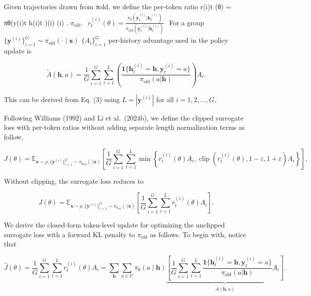 \documentclass[
  10
]{article}
\begin{document}
Given trajectories drawn from πold, we define the per-token ratio r(i)t
(θ) = πθ(y(i)t \textbar h(i)t )(i) (i) .
\(\pi _ { \mathrm { o l d } } .\)
\(\begin{array} { r } { r _ { t } ^ { ( i ) } ( \theta ) = \frac { \pi _ { \theta } ( \mathbf { y } _ { t } ^ { ( i ) } | \mathbf { h } _ { t } ^ { ( i ) } ) } { \pi _ { \mathrm { o l d } } ( \mathbf { y } _ { t } ^ { ( i ) } | \mathbf { h } _ { t } ^ { ( i ) } ) } } \end{array}\)
For a group
\(\{ \mathbf { y } ^ { ( i ) } \} _ { i = 1 } ^ { G } \sim \pi _ { \mathrm { o l d } } ( \cdot \mid \mathbf { x } )\)
\(\{ A _ { i } \} _ { i = 1 } ^ { G }\) per-history advantage used in
the policy update is

\[
\tilde {A} (\mathbf {h}, a) = \frac {1}{G} \sum_ {i = 1} ^ {G} \sum_ {t = 1} ^ {L} \left(\frac {\mathbf {1} \{\mathbf {h} _ {t} ^ {(i)} = \mathbf {h} , \mathbf {y} _ {t} ^ {(i)} = a \}}{\pi_ {\mathrm{old}} (a | \mathbf {h})}\right) A _ {i}.
\]

This can be derived from Eq. (3) using
\(L = | \mathbf { y } ^ { ( i ) } |\) for all
\(i = 1 , 2 , \dots , G .\)

Following Williams (1992) and Li et al.~(2024b), we define the clipped
surrogate loss with per-token ratios without adding separate length
normalization terms as follow,

\[
J (\theta) = \mathbb {E} _ {\mathbf {x} \sim \rho , \{\mathbf {y} ^ {(i)} \} _ {i = 1} ^ {G} \sim \pi_ {\theta_ {\mathrm{old}}} (\cdot | \mathbf {x})} \left[ \frac {1}{G} \sum_ {i = 1} ^ {G} \sum_ {t = 1} ^ {L} \min \left\{r _ {t} ^ {(i)} (\theta) A _ {i}, \operatorname{clip} (r _ {t} ^ {(i)} (\theta), 1 - \varepsilon , 1 + \varepsilon) A _ {i} \right\} \right],
\]

Without clipping, the surrogate loss reduces to

\[
J (\theta) = \mathbb {E} _ {\mathbf {x} \sim \rho , \{\mathbf {y} ^ {(i)} \} _ {i = 1} ^ {G} \sim \pi_ {\theta_ {\mathrm{old}}} (\cdot | \mathbf {x})} \left[ \frac {1}{G} \sum_ {i = 1} ^ {G} \sum_ {t = 1} ^ {L} r _ {t} ^ {(i)} (\theta) A _ {i} \right].
\]

We derive the closed-form token-level update for optimizing the
unclipped surrogate loss with a forward KL penalty to
\(\pi _ { \mathrm { o l d } }\) as follows. To begin with, notice that

\[
\hat {J} (\theta) = \frac {1}{G} \sum_ {i = 1} ^ {G} \sum_ {t = 1} ^ {L} r _ {t} ^ {(i)} (\theta)   A _ {i} = \sum_ {\mathbf {h}} \sum_ {a \in \mathcal {V}} \pi_ {\theta} (a \mid \mathbf {h}) \underbrace {\left[ \frac {1}{G} \sum_ {i = 1} ^ {G} \sum_ {t = 1} ^ {L} \frac {\mathbf {1} \{\mathbf {h} _ {t} ^ {(i)} = \mathbf {h} , \mathbf {y} _ {t} ^ {(i)} = a \}}{\pi_ {\mathrm{old}} (a | \mathbf {h})} A _ {i} \right]} _ {\tilde {A} (\mathbf {h}, a)}.
\]
\end{document}
